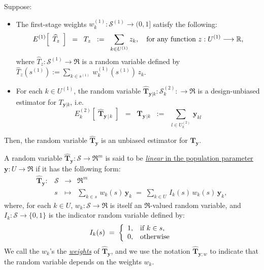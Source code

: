 \documentclass{article}
\begin{document}
\begin{proposition}
\quad
Suppose:
\begin{itemize}
\item	The first-stage weights $w^{(1)}_{k} : \mathcal{S}^{(1)} \longrightarrow (0,1]$
		satisfy the following:
		\begin{equation*}
		E^{(1)}\!\left[\;\,\widehat{T}_{z}\,\;\right] \;\; = \;\; T_{z} \;\;:=\;\; \sum_{k\in U^{(1)}}z_{k},
		\quad\textnormal{for any function $z : U^{(1)} \longrightarrow \Re$,}
		\end{equation*}
		where $\widehat{T}_{z} : \mathcal{S}^{(1)} \longrightarrow \Re$ is a random variable defined by
		$\widehat{T}_{z}(s^{(1)}) := \underset{k \in s^{(1)}}{\sum}\,w^{(1)}_{k}(s^{(1)})\,z_{k}$.
\item	For each $k \in U^{(1)}$, the random variable
		$\widehat{\mathbf{T}}_{\mathbf{y}\vert k} : \mathcal{S}^{(2)}_{k} : \longrightarrow \Re$
		is a design-unbiased
		estimator for $T_{\mathbf{y}\vert k}$, i.e.
		\begin{equation*}
		E^{(2)}_{k}\!\left[\;\widehat{\mathbf{T}}_{\mathbf{y}\,\vert\,k}\;\right]
		\;\;=\;\; \mathbf{T}_{\mathbf{y}\,\vert k}
		\;\;:=\;\; \sum_{l \in U^{(2)}_{k}}\,\mathbf{y}_{kl}
		\end{equation*}
\end{itemize}
Then, the random variable $\widehat{\mathbf{T}}_{\mathbf{y}}$ is an unbiased estimator
for $\mathbf{T}_{\mathbf{y}}$.
\end{proposition}

\begin{definition}
\mbox{}
\vskip 0.1cm
\noindent
A random variable $\widehat{\mathbf{T}}_{\mathbf{y}} : \mathcal{S} \longrightarrow \Re^{m}$
is said to be \underline{\emph{linear} in the population parameter $\mathbf{y} : U \longrightarrow \Re$}
if it has the following form:
\begin{equation*}
\begin{array}{cccl}
\widehat{\mathbf{T}}_{\mathbf{y}} : & \mathcal{S} & \longrightarrow & \Re^{m} \\
     & s &\longmapsto & \underset{k\in s}{\sum}\,w_{k}(s)\,\mathbf{y}_{k} \;=\; \underset{k\in U}{\sum}\,I_{k}(s)\,w_{k}(s)\,\mathbf{y}_{k},
\end{array}
\end{equation*}
where, for each $k \in U$, $w_{k} : \mathcal{S} \longrightarrow \Re$ is itself
an $\Re$-valued random variable, and $I_{k} : \mathcal{S} \longrightarrow \{0,1\}$
is the indicator random variable defined by:
\begin{equation*}
I_{k}(s)
\;=\;
\left\{
\begin{array}{cl}
1, & \textnormal{if $k \in s$}, \\
0, & \textnormal{otherwise}
\end{array}
\right.
\end{equation*}
We call the $w_{k}$'s the \underline{\emph{weights}} of $\widehat{\mathbf{T}}_{\mathbf{y}}$,
and we use the notation $\widehat{\mathbf{T}}_{\mathbf{y};w}$ to indicate that the random
variable depends on the weights $w_{k}$.
\end{definition}
\end{document}
